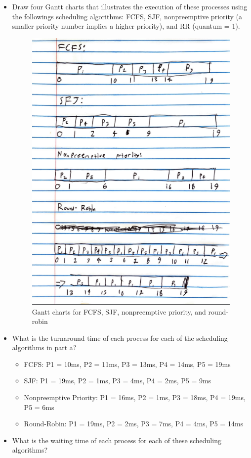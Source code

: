 \documentclass[letterpaper, 10pt,DIV=13]{scrartcl}
\numberwithin{equation}{section} %
\numberwithin{figure}{section} %
\numberwithin{table}{section} %
\begin{document}
\begin{itemize}
    \item Draw four Gantt charts that illustrates the execution of these processes using the followings scheduling algorithms: FCFS, SJF, nonpreemptive priority (a smaller priority number implies a higher priority), and RR (quantum = 1).
\begin{figure}
    \centering
    \includegraphics[width=0.75\linewidth]{lab5.png}
    \caption{Gantt charts for FCFS, SJF, nonpreemptive priority, and round-robin}
    \label{fig:enter-label}
\end{figure}
    \item What is the turnaround time of each process for each of the scheduling algorithms in part a?
    \begin{itemize}
        \item FCFS: P1 = 10ms, P2 = 11ms, P3 = 13ms, P4 = 14ms, P5 = 19ms
        \item SJF: P1 = 19ms, P2 = 1ms, P3 = 4ms, P4 = 2ms, P5 = 9ms
        \item Nonpreemptive Priority: P1 = 16ms, P2 = 1ms, P3 = 18ms, P4 = 19ms, P5 = 6ms
        \item Round-Robin: P1 = 19ms, P2 = 2ms, P3 = 7ms, P4 = 4ms, P5 = 14ms
    \end{itemize}
    \item What is the waiting time of each process for each of these scheduling algorithms?

\end{itemize}
\end{document}
